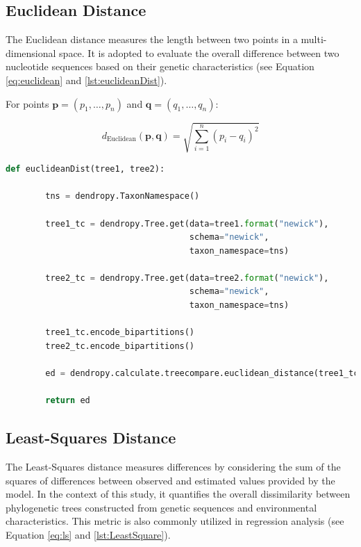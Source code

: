 \subsection{Euclidean Distance}\label{euclidean}
The Euclidean distance measures the length between two points in a multi-dimensional space. It is adopted to evaluate the overall difference between two nucleotide sequences based on their genetic characteristics (see Equation \eqref{eq:euclidean} and \autoref{lst:euclideanDist}).

For points $\mathbf{p} = (p_1, \ldots, p_n)$ and $\mathbf{q} = (q_1, \ldots, q_n)$:

\begin{equation}\label{eq:euclidean}
    d_{\text{Euclidean}}(\mathbf{p}, \mathbf{q}) = \sqrt{\sum_{i=1}^{n} (p_i - q_i)^2}
\end{equation}

\begin{lstlisting}[label=lst:euclideanDist,language=Python,caption=Python script for calculating the Euclidean distance using the ete3 package in the aPhyloGeo package]
    def euclideanDist(tree1, tree2):
        
        tns = dendropy.TaxonNamespace()
        
        tree1_tc = dendropy.Tree.get(data=tree1.format("newick"), 
                                     schema="newick", 
                                     taxon_namespace=tns)
                                     
        tree2_tc = dendropy.Tree.get(data=tree2.format("newick"), 
                                     schema="newick", 
                                     taxon_namespace=tns)
                                     
        tree1_tc.encode_bipartitions()
        tree2_tc.encode_bipartitions()

        ed = dendropy.calculate.treecompare.euclidean_distance(tree1_tc, tree2_tc)

        return ed
\end{lstlisting}

\subsection{Least-Squares Distance}\label{LS}
The Least-Squares distance measures differences by considering the sum of the squares of differences between observed and estimated values provided by the model. In the context of this study, it quantifies the overall dissimilarity between phylogenetic trees constructed from genetic sequences and environmental characteristics. This metric is also commonly utilized in regression analysis (see Equation \eqref{eq:ls} and \autoref{lst:LeastSquare}).

